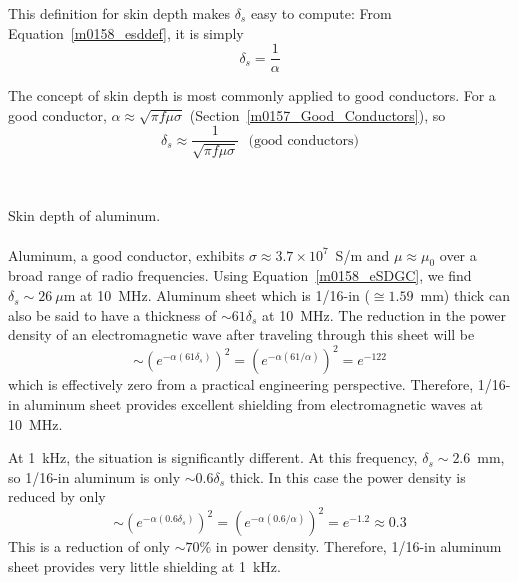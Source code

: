 This definition for skin depth makes $\delta_s$ easy to compute:  From Equation~\ref{m0158_esddef}, it is simply
%
\begin{equation}
\boxed{
\delta_s = \frac{1}{\alpha}
}
\end{equation}

The concept of skin depth is most commonly applied to good conductors.
For a good conductor, $\alpha\approx \sqrt{\pi f\mu\sigma}$ (Section~\ref{m0157_Good_Conductors}), so 
%
\begin{equation}
\delta_s \approx \frac{1}{\sqrt{\pi f\mu\sigma}} ~~~\mbox{(good conductors)}
\label{m0158_eSDGC}
\end{equation}

~\\ \begin{example} 
\begin{mdframed}[backgroundcolor=brown!20,linecolor=brown!20]\raggedright
Skin depth of aluminum. 
\\~\\
Aluminum, a good conductor, exhibits $\sigma\approx 3.7 \times 10^7$~S/m and $\mu\approx\mu_0$ over a broad range of radio frequencies.
Using Equation~\ref{m0158_eSDGC}, we find $\delta_s \sim 26~\mu$m at 10~MHz.
Aluminum sheet which is 1/16-in ($\cong 1.59$~mm) thick can also be said to have a thickness of $\sim 61\delta_s$ at 10~MHz.
The reduction in the power density of an electromagnetic wave after traveling through this sheet will be
$$ \sim\left(e^{-\alpha\left(61\delta_s\right)}\right)^2 = \left(e^{-\alpha\left(61/\alpha\right)}\right)^2 = e^{-122} $$
which is effectively zero from a practical engineering perspective.  Therefore, 1/16-in aluminum sheet provides excellent shielding from electromagnetic waves at 10~MHz.

\noindent
At 1~kHz, the situation is significantly different.
At this frequency, $\delta_s\sim 2.6$~mm, so 1/16-in aluminum is only $\sim 0.6\delta_s$ thick.
In this case the power density is reduced by only 
$$ \sim\left(e^{-\alpha\left(0.6\delta_s\right)}\right)^2 = \left(e^{-\alpha\left(0.6/\alpha\right)}\right)^2 = e^{-1.2} \approx 0.3 $$
This is a reduction of only $\sim70$\% in power density.
Therefore, 1/16-in aluminum sheet provides very little shielding at 1~kHz.
\end{mdframed}
\end{example}





